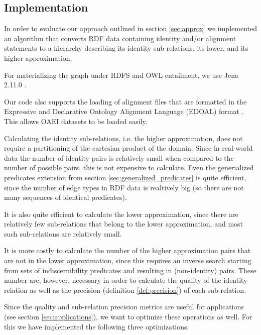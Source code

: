 \subsection{Implementation}
\label{sec:implementation}

In order to evaluate our approach outlined in section \ref{sec:approx}
  we implemented an algorithm that converts RDF data
  containing identity and/or alignment statements
  to a hierarchy describing its identity sub-relations,
  its lower, and its higher approximation.

For materializing the graph under RDFS and OWL entailment,
  we use Jena 2.11.0 \cite{Carroll2004}.

Our code also supports the loading of alignment files that are formatted in
  the Expressive and Declarative Ontology Alignment Language (EDOAL)
  format \cite{DavidEzenatScharffeTrojahn2011}.
This allows OAEI datasets to be loaded easily.

Calculating the identity sub-relations, i.e. the higher approximation,
  does not require a partitioning of the cartesian product of the domain.
Since in real-world data the number of identity pairs
  is relatively small when compared to the number of possible pairs,
  this is not expensive to calculate.
Even the generialized predicates extension
  from section \ref{sec:generalized_predicates} is quite efficient,
  since the number of edge types in RDF data is realtively big
  (so there are not many sequences of identical predicates).

It is also quite efficient to calculate the lower approximation,
  since there are relatively few sub-relations
  that belong to the lower approximation,
  and most such sub-relations are relatively small.

It is more costly to calculate the number of the higher approximation pairs
  that are not in the lower approximation,
  since this requires an inverse search
  starting from sets of indiscernibility predicates
  and resulting in (non-identity) pairs.
These number are, however, necessary in order to
  calculate the quality of the identity relation
  as well as the precision (definition \ref{def:precision})
  of each sub-relation.

Since the quality and sub-relation precision metrics are
  useful for applications (see section \ref{sec:applications}),
  we want to optimize these operations as well.
For this we have implemented the following three optimizations.

